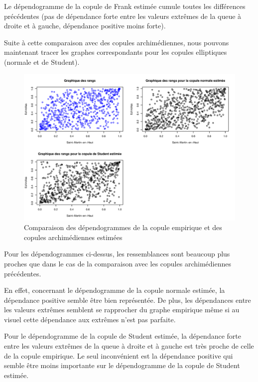 Le dépendogramme de la copule de Frank estimée cumule toutes les différences précédentes (pas de dépendance forte entre les valeurs extrêmes de la queue à droite et à gauche, dépendance positive moins forte).

Suite à cette comparaison avec des copules archimédiennes, nous pouvons maintenant tracer les graphes correspondants pour les copules elliptiques (normale et de Student).


\noindent%
\begin{figure}[H]
    \begin{center}
      \includegraphics[width=17 cm, angle=0]{./pictures/dependellip.png}
      \centering\caption{\label{2}Comparaison des dépendogrammes de la copule empirique et des copules archimédiennes estimées}
    \end{center}
\end{figure}

Pour les dépendogrammes ci-dessus, les ressemblances sont beaucoup plus proches que dans le cas de la comparaison avec les copules archimédiennes précédentes.

En effet, concernant le dépendogramme de la copule normale estimée, la dépendance positive semble être bien représentée. De plus, les dépendances entre les valeurs extrêmes semblent se rapprocher du graphe empirique même si au visuel cette dépendance aux extrêmes n'est pas parfaite.

Pour le dépendogramme de la copule de Student estimée, la dépendance forte entre les valeurs extrêmes de la queue à droite et à gauche est très proche de celle de la copule empirique. Le seul inconvénient est la dépendance positive qui semble être moins importante sur le dépendogramme de la copule de Student estimée.

